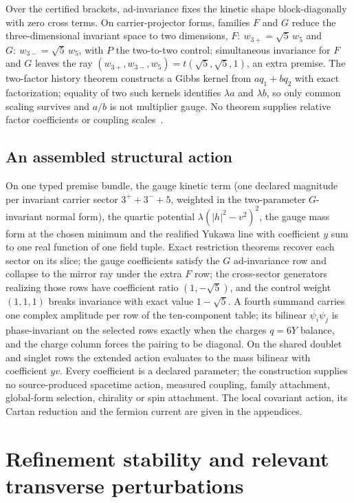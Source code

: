 \documentclass[11pt]{article}
\begin{document}
Over the certified brackets, ad-invariance fixes the kinetic shape
block-diagonally with zero cross terms. On carrier-projector forms, families
\(F\) and \(G\) reduce the three-dimensional invariant space to two
dimensions, \(F:\ w_{3+}=\sqrt5\,w_5\) and \(G:\ w_{3-}=\sqrt5\,w_5\), with
\(P\) the two-to-two control; simultaneous invariance for \(F\) and \(G\) leaves
the ray \((w_{3+},w_{3-},w_5)=t(\sqrt5,\sqrt5,1)\), an extra premise. The
two-factor history theorem constructs a Gibbs kernel from \(aq_1+bq_2\) with
exact factorization; equality of two such kernels identifies \(\lambda a\) and
\(\lambda b\), so only common scaling survives and \(a/b\) is not multiplier
gauge. No theorem supplies relative factor coefficients or coupling
scales~\cite{ophfpe,ophrepo}.

\subsection{An assembled structural action}

On one typed premise bundle, the gauge kinetic term (one declared magnitude
per invariant carrier sector \(3^++3^-+5\), weighted in the two-parameter
\(G\)-invariant normal form), the quartic potential \(\lambda(|h|^2-v^2)^2\),
the gauge mass form at the chosen minimum and the realified Yukawa line with
coefficient \(y\) sum to one real function of one field tuple. Exact
restriction theorems recover each sector on its slice; the gauge coefficients
satisfy the \(G\) ad-invariance row and collapse to the mirror ray under the
extra \(F\) row; the cross-sector generators realizing those rows have
coefficient ratio \((1,-\sqrt5)\), and the control weight \((1,1,1)\) breaks
invariance with exact value \(1-\sqrt5\). A fourth summand carries one complex
amplitude per row of the ten-component table; its bilinear
\(\overline{\psi_i}\psi_j\) is phase-invariant on the selected rows exactly
when the charges \(q=6Y\) balance, and the charge column forces the pairing
to be diagonal. On the shared doublet and singlet rows the extended action
evaluates to the mass bilinear with coefficient \(yv\). Every coefficient is
a declared parameter; the construction supplies no source-produced spacetime
action, measured coupling, family attachment, global-form selection, chirality
or spin attachment. The local covariant action, its Cartan reduction and the
fermion current are given in the appendices.

\section{Refinement stability and relevant transverse perturbations}
\label{sec:refinement-stability}
\end{document}
